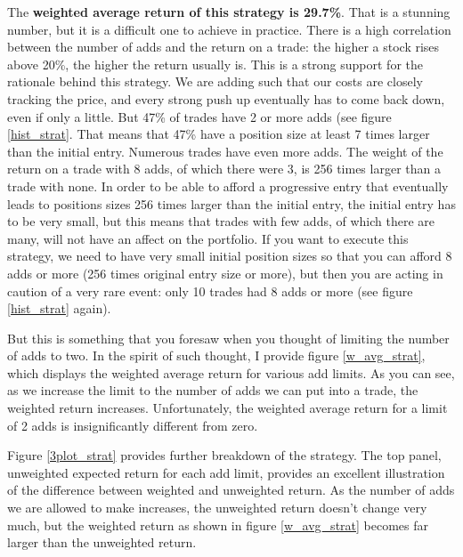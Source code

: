 \documentclass{article}
\begin{document}
The \textbf{weighted average return of this strategy is 29.7\%}. That is a stunning number, but it is a difficult one to achieve in practice. There is a high correlation between the number of adds and the return on a trade: the higher a stock rises above 20\%, the higher the return usually is. This is a strong support for the rationale behind this strategy. We are adding such that our costs are closely tracking the price, and every strong push up eventually has to come back down, even if only a little. But 47\% of trades have 2 or more adds (see figure \ref{hist_strat}. That means that 47\% have a position size at least 7 times larger than the initial entry. Numerous trades have even more adds. The weight of the return on a trade with 8 adds, of which there were 3, is 256 times larger than a trade with none. In order to be able to afford a progressive entry that eventually leads to positions sizes 256 times larger than the initial entry, the initial entry has to be very small, but this means that trades with few adds, of which there are many, will not have an affect on the portfolio. If you want to execute this strategy, we need to have very small initial position sizes so that you can afford 8 adds or more (256 times original entry size or more), but then you are acting in caution of a very rare event: only 10 trades had 8 adds or more (see figure \ref{hist_strat} again).

But this is something that you foresaw when you thought of limiting the number of adds to two. In the spirit of such thought, I provide figure \ref{w_avg_strat}, which displays the weighted average return for various add limits. As you can see, as we increase the limit to the number of adds we can put into a trade, the weighted return increases. Unfortunately, the weighted average return for a limit of 2 adds is insignificantly different from zero. 

Figure \ref{3plot_strat} provides further breakdown of the strategy. The top panel, unweighted expected return for each add limit, provides an excellent illustration of the difference between weighted and unweighted return. As the number of adds we are allowed to make increases, the unweighted return doesn't change very much, but the weighted return as shown in figure \ref{w_avg_strat} becomes far larger than the unweighted return.
\end{document}
